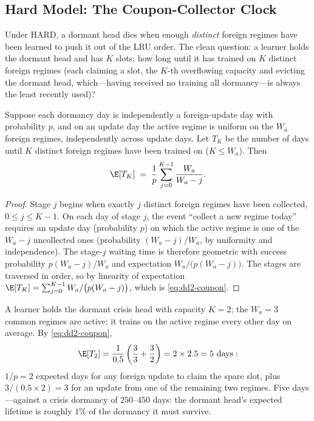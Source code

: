 \subsection{Hard Model: The Coupon-Collector Clock}

Under HARD, a dormant head dies when enough \emph{distinct} foreign regimes
have been learned to push it out of the LRU order. The clean question: a
learner holds the dormant head and has $K$ slots; how long until it has
trained on $K$ distinct foreign regimes (each claiming a slot, the $K$-th
overflowing capacity and evicting the dormant head, which---having received no
training all dormancy---is always the least recently used)?

\begin{proposition}
\label{prop:dd2-coupon}
Suppose each dormancy day is independently a foreign-update day with
probability $p$, and on an update day the active regime is uniform on the
$W_a$ foreign regimes, independently across update days. Let $T_K$ be the
number of days until $K$ distinct foreign regimes have been trained on
($K \le W_a$). Then
\begin{equation}
\label{eq:dd2-coupon}
\E[T_K] \;=\; \frac{1}{p} \sum_{j=0}^{K-1} \frac{W_a}{W_a - j}.
\end{equation}
\end{proposition}

\begin{proof}
Stage $j$ begins when exactly $j$ distinct foreign regimes have been
collected, $0 \le j \le K-1$. On each day of stage $j$, the event ``collect a
new regime today'' requires an update day (probability $p$) on which the
active regime is one of the $W_a - j$ uncollected ones (probability
$(W_a - j)/W_a$, by uniformity and independence). The stage-$j$ waiting time
is therefore geometric with success probability $p (W_a - j)/W_a$ and
expectation $W_a / \bigl(p (W_a - j)\bigr)$. The stages are traversed in
order, so by linearity of expectation
$\E[T_K] = \sum_{j=0}^{K-1} W_a / \bigl(p(W_a - j)\bigr)$, which is
\eqref{eq:dd2-coupon}.
\end{proof}

\begin{example}[Worked numbers: $W_a = 3$, $K = 2$, $p = \tfrac12$]
\label{ex:dd2-coupon}
A learner holds the dormant \textsf{crisis} head with capacity $K = 2$; the
$W_a = 3$ common regimes are active; it trains on the active regime every
other day on average. By \eqref{eq:dd2-coupon},
\[
\E[T_2]
= \frac{1}{0.5}\left(\frac{3}{3} + \frac{3}{2}\right)
= 2 \times 2.5
= 5 \text{ days}:
\]
$1/p = 2$ expected days for any foreign update to claim the spare slot, plus
$3/(0.5 \times 2) = 3$ for an update from one of the remaining two regimes.
Five days---against a crisis dormancy of $250$--$450$ days: the dormant
head's expected lifetime is roughly $1\%$ of the dormancy it must survive.
\end{example}

